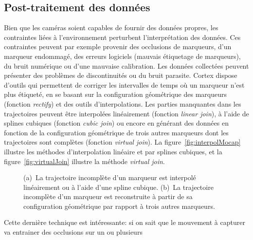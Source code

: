 \subsection{Post-traitement des données}
Bien que les caméras soient capables de fournir des données propres,
les contraintes liées à l'environnement perturbent l'interprétation des données.
Ces contraintes peuvent par exemple provenir des occlusions de marqueurs, d'un marqueur
endommagé, des erreurs logiciels (mauvais étiquetage de marqueurs), 
du bruit numérique ou d'une mauvaise calibration. 
Les données collectées peuvent présenter des problèmes de discontinuités ou du bruit parasite.
Cortex dispose d'outils qui permettent de corriger les intervalles de temps où un marqueur 
n'est plus étiqueté, en se basant
sur la configuration géométrique des marqueurs (fonction \emph{rectify}) et des outils d'interpolations.
Les parties manquantes dans les trajectoires peuvent être interpolées linéairement (fonction \emph{linear join}), 
à l'aide de splines cubiques (fonction \emph{cubic join})
ou encore en générant des données en fonction de la configuration géométrique de trois autres marqueurs 
dont les trajectoires sont complètes (fonction \emph{virtual join}).
La figure~\ref{fig:interpolMocap} illustre les méthodes
d'interpolation linéaire et par splines cubiques, et la figure~\ref{fig:virtualJoin}
illustre la méthode \emph{virtual join}. 
\begin{figure}[p]
  \begin{center}
    \hspace{50px}
  \end{center}
  \caption[Interpolation de la position de marqueurs.]{(a)~La trajectoire incomplète d'un marqueur est interpolé linéairement ou à l'aide d'une spline cubique.
  (b)~La trajectoire incomplète d'un marqueur est reconstruite à partir
  de sa configuration géométrique par rapport à trois autres marqueurs.}
\end{figure}
Cette dernière technique 
est intéressante: si on sait que le mouvement à capturer va  entrainer des occlusions sur un ou plusieurs
